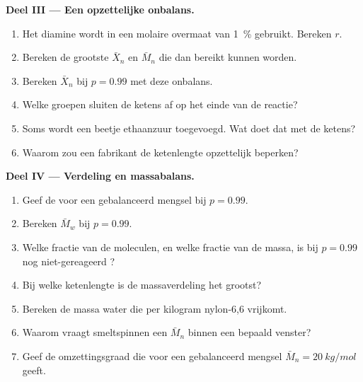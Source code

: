 \begin{problem}
\medskip
\noindent\textbf{Deel III --- Een opzettelijke onbalans.}
\begin{enumerate}[resume]
  \item Het diamine wordt in een molaire overmaat van 1~\% gebruikt. Bereken $r$.
  \item Bereken de grootste $\bar X_n$ en $\bar M_n$ die dan bereikt kunnen worden.
  \item Bereken $\bar X_n$ bij $p = 0.99$ met deze onbalans.
  \item Welke groepen sluiten de ketens af op het einde van de reactie?
  \item Soms wordt een beetje ethaanzuur toegevoegd. Wat doet dat met de ketens?
  \item Waarom zou een fabrikant de ketenlengte opzettelijk beperken?
\end{enumerate}

\medskip
\noindent\textbf{Deel IV --- Verdeling en massabalans.}
\begin{enumerate}[resume]
  \item Geef de  voor een gebalanceerd mengsel bij $p = 0.99$.
  \item Bereken $\bar M_w$ bij $p = 0.99$.
  \item Welke fractie van de moleculen, en welke fractie van de massa, is bij $p = 0.99$ nog
        niet-gereageerd ?
  \item Bij welke ketenlengte is de massaverdeling het grootst?
  \item Bereken de massa water die per kilogram nylon-6,6 vrijkomt.
  \item Waarom vraagt smeltspinnen een $\bar M_n$ binnen een bepaald venster?
  \item Geef de omzettingsgraad die voor een gebalanceerd mengsel $\bar M_n = \qty{20}{kg/mol}$ geeft.
\end{enumerate}
\end{problem}
